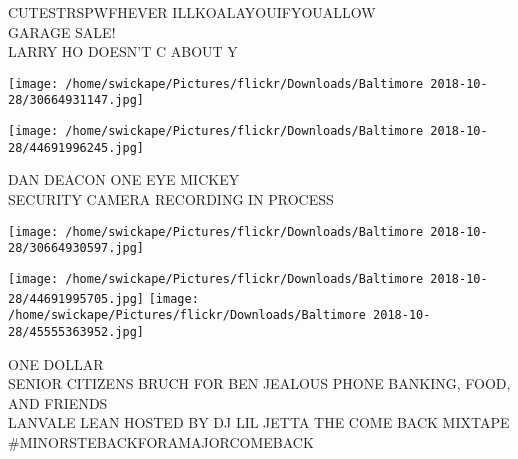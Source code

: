 \documentclass[10pt,letterpaper]{article}
\begin{document}
CUTESTRSPWFHEVER ILLKOALAYOUIFYOUALLOW\\
GARAGE SALE!\\
LARRY HO DOESN'T C ABOUT Y
\pagebreak

\texttt{[image: /home/swickape/Pictures/flickr/Downloads/Baltimore 2018-10-28/30664931147.jpg]}

\vspace{0.25in}
\texttt{[image: /home/swickape/Pictures/flickr/Downloads/Baltimore 2018-10-28/44691996245.jpg]}

DAN DEACON ONE EYE MICKEY\\
SECURITY CAMERA RECORDING IN PROCESS
\pagebreak

\texttt{[image: /home/swickape/Pictures/flickr/Downloads/Baltimore 2018-10-28/30664930597.jpg]}

\vspace{0.25in}
\texttt{[image: /home/swickape/Pictures/flickr/Downloads/Baltimore 2018-10-28/44691995705.jpg]}
\texttt{[image: /home/swickape/Pictures/flickr/Downloads/Baltimore 2018-10-28/45555363952.jpg]}

ONE DOLLAR\\
SENIOR CITIZENS BRUCH FOR BEN JEALOUS PHONE BANKING, FOOD, AND FRIENDS\\
LANVALE LEAN HOSTED BY DJ LIL JETTA THE COME BACK MIXTAPE \#MINORSTEBACKFORAMAJORCOMEBACK
\pagebreak
\end{document}

